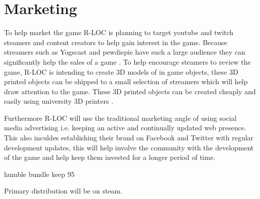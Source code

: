 \documentclass{scrartcl}
\begin{document}
\section{Marketing}
To help market the game R-LOC is planning to target youtube and twitch steamers and content creators to help gain interest in the game. 
Because streamers such as Yogscast and pewdiepie have such a large audience they can significantly help the sales of a game \cite{Hoggins, Rose}.  To help encourage steamers to review the game, R-LOC is intending to create 3D models of in game objects, these 3D printed objects can be shipped to a small selection of streamers which will help draw attention to the game. These 3D printed objects can be created cheaply and easily using university 3D printers \cite{Rose}.

Furthermore R-LOC will use the traditional marketing angle of using social media advertising i.e. keeping an active and continually updated web presence. 
This also inculdes establishing their brand on Facebook and Twitter with regular development updates, this will help involve the community with the development of the game and help keep them invested for a longer period of time.

humble bundle keep 95%

Primary distribution will be on steam.






\end{document}
